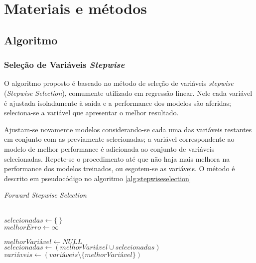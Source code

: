 \chapter[Materiais e métodos]{Materiais e métodos}

\section{Algoritmo}

\subsection{Seleção de Variáveis \textit{Stepwise}}

O algoritmo proposto é baseado no método de seleção de variáveis \textit{stepwise} (\textit{Stepwise Selection}), 
comumente utilizado em regressão linear. Nele cada variável é ajustada isoladamente à saída e a performance dos 
modelos são aferidas; seleciona-se a variável que apresentar o melhor resultado. 

Ajustam-se novamente modelos considerando-se cada uma das variáveis restantes em conjunto com as previamente 
selecionadas; a variável correspondente ao modelo de melhor performance é adicionada ao conjunto de variáveis 
selecionadas. Repete-se o procedimento até que não haja mais melhora na performance dos modelos treinados, ou 
esgotem-se as variáveis. O método é descrito em pseudocódigo no algoritmo \ref{alg:stepwiseselection}

\begin{algorithm}
    \caption{\textit{Forward Stepwise Selection}}
    \ \\
    $selecionadas \gets \{\ \}$ \\
    $melhorErro \gets \infty$ \\
    \ \\
    {   
        $melhorVariável \gets NULL$ \\     
        $selecionadas \gets (melhorVariável \cup selecionadas)$ \\
        $variáveis \gets (variáveis \setminus \{melhorVariável\})$ \\
    }
    \label{alg:stepwiseselection}
\end{algorithm}

